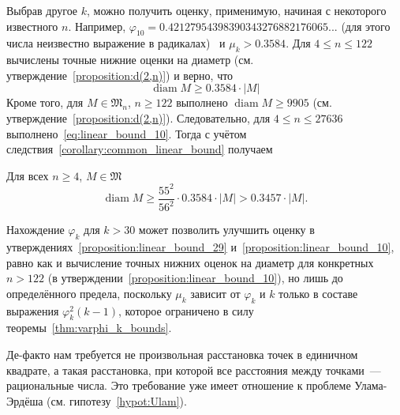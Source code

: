 Выбрав другое $k$, можно получить оценку, применимую, начиная с некоторого известного $n$.
Например, $\varphi_{10} = 0.42127954398390343276882176065...$
(для этого числа неизвестно выражение в радикалах)~\cite{degroot1990optimal10points} и
$\mu_k > 0.3584$.
Для $4 \leq n \leq 122$ вычислены точные нижние оценки на диаметр (см. утверждение~\ref{proposition:d(2,n)}) и верно, что
\begin{equation}
	\label{eq:linear_bound_10}
	\operatorname{diam} M \geq 0.3584 \cdot |M|
\end{equation}
Кроме того, для $M \in \mathfrak{M}_n$, $n \geq 122$ выполнено
$\operatorname{diam} M \geq 9905$ (см. утверждение~\ref{proposition:d(2,n)}).
Следовательно, для $4 \leq n \leq 27636$ выполнено~\eqref{eq:linear_bound_10}.
Тогда с учётом следствия~\ref{corollary:common_linear_bound} получаем
\begin{proposition}
	\label{proposition:linear_bound_10}
	Для всех $n \geq 4$, $M\in\mathfrak{M}$
	\begin{equation*}
		\operatorname{diam} M \geq \frac{55^2}{56^2} \cdot 0.3584 \cdot |M|
		>
		0.3457 \cdot |M|
		.
	\end{equation*}
\end{proposition}

\begin{remark}
	Нахождение $\varphi_k$ для $k > 30$ может позволить улучшить оценку
	в утверждениях~\ref{proposition:linear_bound_29} и~\ref{proposition:linear_bound_10},
	равно как и вычисление точных нижних оценок на диаметр для конкретных $n>122$ (в утверждении~\ref{proposition:linear_bound_10}),
	но лишь до определённого предела, поскольку $\mu_k$ зависит от $\varphi_k$ и $k$
	только в составе выражения $\varphi_k^2 (k-1)$,
	которое ограничено в силу теоремы~\ref{thm:varphi_k_bounds}.
\end{remark}

\begin{remark}
	Де-факто нам требуется не произвольная расстановка точек в единичном квадрате,
	а такая расстановка, при которой все расстояния между точками~--- рациональные числа.
	Это требование уже имеет отношение к проблеме Улама-Эрдёша (см. гипотезу~\ref{hypot:Ulam}).
\end{remark}
